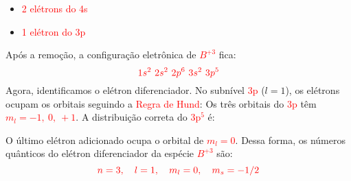 \documentclass[a4paper, 12pt]{article}
\begin{document}
\begin{enumerate}
\begin{enumerate}
{                        \begin{itemize}
                            \item[]  \textcolor{red}{2 elétrons do 4s}
                            \item[]  \textcolor{red}{1 elétron do 3p}
                        \end{itemize}
                        Após a remoção, a configuração eletrônica de  \textcolor{red}{\( B^{+3} \)} fica:
                        \[
                            \textcolor{red}{1s^2 \ 2s^2 \ 2p^6 \ 3s^2 \ 3p^5}
                        \]
                        Agora, identificamos o elétron diferenciador. No subnível  \textcolor{red}{3p} (\( l = 1 \)), os elétrons ocupam os orbitais seguindo a  \textcolor{red}{Regra de Hund}:
                        Os três orbitais do \textcolor{red}{3p} têm \textcolor{red}{\( m_l = -1,\ 0,\ +1 \)}. A distribuição correta do  \textcolor{red}{3p\(^5\)} é:
                        
                        O último elétron adicionado ocupa o orbital de  \textcolor{red}{\( m_l = 0 \)}.
                        Dessa forma, os números quânticos do elétron diferenciador da espécie  \textcolor{red}{\( B^{+3} \)} são:
                        \[
                            \textcolor{red}{ n = 3, \quad l = 1, \quad m_l = 0, \quad m_s = -1/2}
                        \]
                    }


\end{enumerate}
\end{enumerate}
\end{document}

